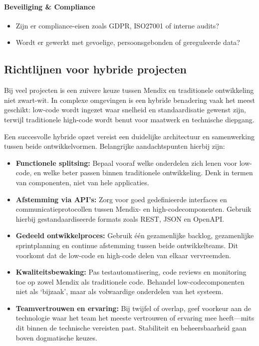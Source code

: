 \paragraph{Beveiliging \& Compliance}
\begin{itemize}
    \item Zijn er compliance-eisen zoals GDPR, ISO27001 of interne audits?
    \item Wordt er gewerkt met gevoelige, persoonsgebonden of gereguleerde data?
\end{itemize}


\subsection{Richtlijnen voor hybride projecten}
Bij veel projecten is een zuivere keuze tussen Mendix en traditionele ontwikkeling niet zwart-wit. In complexe omgevingen is een hybride benadering vaak het meest geschikt: low-code wordt ingezet waar snelheid en standaardisatie gewenst zijn, terwijl traditionele high-code wordt benut voor maatwerk en technische diepgang.

Een succesvolle hybride opzet vereist een duidelijke architectuur en samenwerking tussen beide ontwikkelvormen. Belangrijke aandachtspunten hierbij zijn:

\begin{itemize}
    \item \textbf{Functionele splitsing:} Bepaal vooraf welke onderdelen zich lenen voor low-code, en welke beter passen binnen traditionele ontwikkeling. Denk in termen van componenten, niet van hele applicaties.
    
    \item \textbf{Afstemming via API’s:} Zorg voor goed gedefinieerde interfaces en communicatieprotocollen tussen Mendix- en high-codecomponenten. Gebruik hierbij gestandaardiseerde formats zoals REST, JSON en OpenAPI.
    
    \item \textbf{Gedeeld ontwikkelproces:} Gebruik één gezamenlijke backlog, gezamenlijke sprintplanning en continue afstemming tussen beide ontwikkelteams. Dit voorkomt dat de low-code en high-code delen van elkaar vervreemden.
    
    \item \textbf{Kwaliteitsbewaking:} Pas testautomatisering, code reviews en monitoring toe op zowel Mendix als traditionele code. Behandel low-codecomponenten niet als ‘bijzaak’, maar als volwaardige onderdelen van het systeem.
    
    \item \textbf{Teamvertrouwen en ervaring:} Bij twijfel of overlap, geef voorkeur aan de technologie waar het team het meeste vertrouwen of ervaring mee heeft—mits dit binnen de technische vereisten past. Stabiliteit en beheersbaarheid gaan boven dogmatische keuzes.
\end{itemize}

